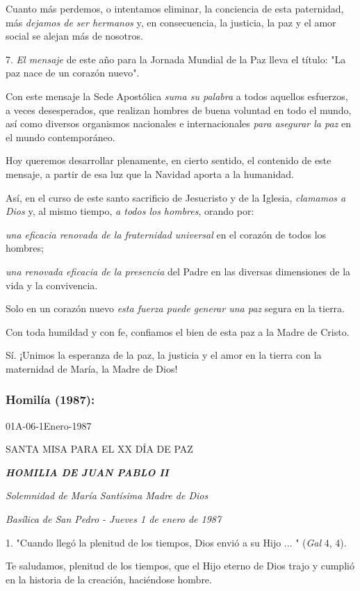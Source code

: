 \begin{body}
Cuanto más perdemos, o intentamos eliminar, la conciencia de esta paternidad, más \emph{dejamos de ser hermanos} y, en consecuencia, la justicia, la paz y el amor social se alejan más de nosotros.

7. \emph{El mensaje} de este año para la Jornada Mundial de la Paz lleva el título: "La paz nace de un corazón nuevo".

Con este mensaje la Sede Apostólica \emph{suma su palabra} a todos aquellos esfuerzos, a veces desesperados, que realizan hombres de buena voluntad en todo el mundo, así como diversos organismos nacionales e internacionales \emph{para asegurar la paz} en el mundo contemporáneo.

Hoy queremos desarrollar plenamente, en cierto sentido, el contenido de este mensaje, a partir de esa luz que la Navidad aporta a la humanidad.

Así, en el curso de este santo sacrificio de Jesucristo y de la Iglesia, \emph{clamamos a Dios} y, al mismo tiempo, \emph{a todos los hombres}, orando por:

\emph{una eficacia renovada de la fraternidad universal} en el corazón de todos los hombres;

\emph{una renovada eficacia de la presencia} del Padre en las diversas dimensiones de la vida y la convivencia.

Solo en un corazón nuevo \emph{esta fuerza puede generar una paz} segura en la tierra.

Con toda humildad y con fe, confiamos el bien de esta paz a la Madre de Cristo.

Sí. ¡Unimos la esperanza de la paz, la justicia y el amor en la tierra con la maternidad de María, la Madre de Dios!

\subsubsection{Homilía (1987): } 01A-06-1Enero-1987

SANTA MISA PARA EL XX DÍA DE PAZ

\emph{\textbf{HOMILIA DE JUAN PABLO II}}

\emph{Solemnidad de María Santísima Madre de Dios}

\emph{Basílica de San Pedro - Jueves 1 de enero de 1987}

1. "Cuando llegó la plenitud de los tiempos, Dios envió a su Hijo ... " (\emph{Gal} 4, 4).

Te saludamos, plenitud de los tiempos, que el Hijo eterno de Dios trajo y cumplió en la historia de la creación, haciéndose hombre.


\end{body}
